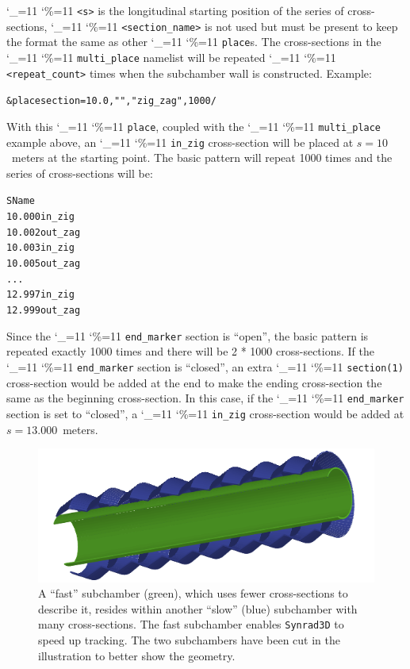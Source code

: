 \documentclass[11pt,openany]{report}
\newcommand{\srthree}{\texttt{Synrad3D}\xspace}
\newcommand\ttcmd{\begingroup\catcode`\_=11 \catcode`\%=11 \dottcmd}
\newcommand\dottcmd[1]{\texttt{#1}\endgroup}
\newcommand{\vn}{\ttcmd}
\newlength{\ExBeg}
\newlength{\ExEnd}
\newenvironment{example}
  {\vspace{\ExBeg} \begin{alltt}}
  {\end{alltt} \vspace{\ExEnd}}
\begin{document}
\vn{<s>} is the longitudinal starting position of the series of
cross-sections, \vn{<section_name>} is not used but must be present to
keep the format the same as other \vn{place}s. The cross-sections in the
\vn{multi_place} namelist will be repeated \vn{<repeat_count>}
times when the subchamber wall is constructed. Example:
\begin{example}
  &place section = 10.0, "", "zig_zag", 1000 /
\end{example}
With this \vn{place}, coupled with the \vn{multi_place}
example above, an \vn{in_zig} cross-section will be placed at $s =
10$~meters at the starting point. The basic pattern will repeat 1000
times and the series of cross-sections will be:
\begin{example}
     S       Name
  10.000     in_zig
  10.002     out_zag
  10.003     in_zig
  10.005     out_zag
  ...
  12.997     in_zig
  12.999     out_zag
\end{example}
Since the \vn{end_marker} section is ``open'', the basic pattern is
repeated exactly 1000 times and there will be 2 * 1000
cross-sections. If the \vn{end_marker} section is ``closed'', an extra
\vn{section(1)} cross-section would be added at the end to make the
ending cross-section the same as the beginning cross-section. In this
case, if the \vn{end_marker} section is set to ``closed'', a
\vn{in_zig} cross-section would be added at $s = 13.000$~meters.

  \begin{figure}
  \centering
  \includegraphics[width=6in]{fast-chamber.pdf}
  \caption[Illustrating a fast subchamber residing within another subchamber.]
{\label{f:fast} A ``fast'' subchamber (green), which uses fewer cross-sections to describe
it, resides within another ``slow'' (blue) subchamber with many cross-sections. The fast
subchamber enables \srthree to speed up tracking. The two subchambers have been cut in
the illustration to better show the geometry.}
  \end{figure}
\end{document}
